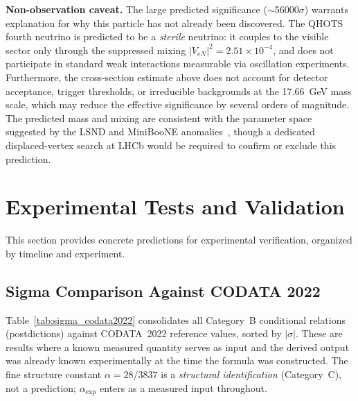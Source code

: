 \documentclass[aps,prd,twocolumn,superscriptaddress,floatfix,nofootinbib]{revtex4-2}
\theoremstyle{definition}
\theoremstyle{remark}
\begin{document}
\textbf{Non-observation caveat.}
The large predicted significance ($\sim$56000$\sigma$) warrants explanation for why this particle has not already been discovered. The QHOTS fourth neutrino is predicted to be a \textit{sterile} neutrino: it couples to the visible sector only through the suppressed mixing $|V_{eN}|^2 = 2.51 \times 10^{-4}$, and does not participate in standard weak interactions measurable via oscillation experiments. Furthermore, the cross-section estimate above does not account for detector acceptance, trigger thresholds, or irreducible backgrounds at the 17.66~GeV mass scale, which may reduce the effective significance by several orders of magnitude. The predicted mass and mixing are consistent with the parameter space suggested by the LSND and MiniBooNE anomalies~\cite{pdg2024}, though a dedicated displaced-vertex search at LHCb would be required to confirm or exclude this prediction.

\section{Experimental Tests and Validation}
\label{sec:experiments}

This section provides concrete predictions for experimental verification, organized by timeline and experiment.

\subsection{Sigma Comparison Against CODATA 2022}
\label{sec:sigma_table}

Table~\ref{tab:sigma_codata2022} consolidates all Category~B conditional relations (postdictions)
against CODATA~2022 reference values, sorted by $|\sigma|$.  These are results where a known
measured quantity serves as input and the derived output was already known experimentally
at the time the formula was constructed.  The fine structure constant $\alpha = 28/3837$ is
a \emph{structural identification} (Category~C), not a prediction; $\alpha_\text{exp}$ enters
as a measured input throughout.
\end{document}
